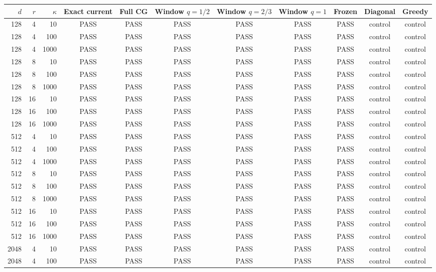 \begin{tabular}{rrrcccccccc}
\toprule
$d$ & $r$ & $\kappa$ & Exact current & Full CG & Window $q=1/2$ & Window $q=2/3$ & Window $q=1$ & Frozen & Diagonal & Greedy \\
\midrule
128 & 4 & 10 & PASS & PASS & PASS & PASS & PASS & PASS & control & control \\
128 & 4 & 100 & PASS & PASS & PASS & PASS & PASS & PASS & control & control \\
128 & 4 & 1000 & PASS & PASS & PASS & PASS & PASS & PASS & control & control \\
128 & 8 & 10 & PASS & PASS & PASS & PASS & PASS & PASS & control & control \\
128 & 8 & 100 & PASS & PASS & PASS & PASS & PASS & PASS & control & control \\
128 & 8 & 1000 & PASS & PASS & PASS & PASS & PASS & PASS & control & control \\
128 & 16 & 10 & PASS & PASS & PASS & PASS & PASS & PASS & control & control \\
128 & 16 & 100 & PASS & PASS & PASS & PASS & PASS & PASS & control & control \\
128 & 16 & 1000 & PASS & PASS & PASS & PASS & PASS & PASS & control & control \\
512 & 4 & 10 & PASS & PASS & PASS & PASS & PASS & PASS & control & control \\
512 & 4 & 100 & PASS & PASS & PASS & PASS & PASS & PASS & control & control \\
512 & 4 & 1000 & PASS & PASS & PASS & PASS & PASS & PASS & control & control \\
512 & 8 & 10 & PASS & PASS & PASS & PASS & PASS & PASS & control & control \\
512 & 8 & 100 & PASS & PASS & PASS & PASS & PASS & PASS & control & control \\
512 & 8 & 1000 & PASS & PASS & PASS & PASS & PASS & PASS & control & control \\
512 & 16 & 10 & PASS & PASS & PASS & PASS & PASS & PASS & control & control \\
512 & 16 & 100 & PASS & PASS & PASS & PASS & PASS & PASS & control & control \\
512 & 16 & 1000 & PASS & PASS & PASS & PASS & PASS & PASS & control & control \\
2048 & 4 & 10 & PASS & PASS & PASS & PASS & PASS & PASS & control & control \\
2048 & 4 & 100 & PASS & PASS & PASS & PASS & PASS & PASS & control & control \\

\end{tabular}
